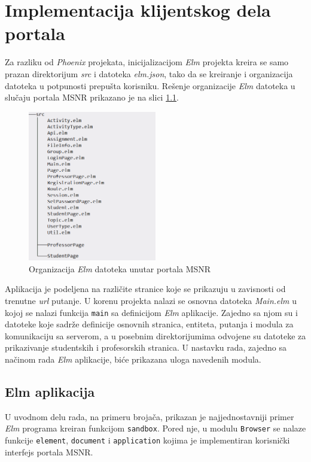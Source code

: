 \documentclass[12pt,oneside]{memoir}
\begin{document}
\chapter{Implementacija klijentskog dela portala}
Za razliku od \emph{Phoenix} projekata, inicijalizacijom \emph{Elm} projekta kreira
se samo prazan direktorijum \emph{src} i datoteka \emph{elm.json}, tako da se kreiranje i
organizacija datoteka u potpunosti prepušta korisniku. Rešenje organizacije \emph{Elm} datoteka u slučaju
portala MSNR prikazano je na slici \ref{fig:msnr-elm-src}.
\begin{figure}[!h]
  \centering
  \includegraphics[width=0.5\textwidth]{msnr-elm-src.png}
  \caption{Organizacija \emph{Elm} datoteka unutar portala MSNR}
  \label{fig:msnr-elm-src}
\end{figure}

Aplikacija je podeljena na različite stranice koje se prikazuju u zavisnosti od trenutne \emph{url} putanje. 
U korenu projekta nalazi se osnovna datoteka \emph{Main.elm} u kojoj se nalazi funkcija \texttt{main} sa definicijom \emph{Elm} aplikacije.
Zajedno sa njom su i datoteke koje sadrže definicije osnovnih stranica, entiteta, putanja i modula za komunikaciju sa serverom, a
u posebnim direktorijumima odvojene su datoteke za prikazivanje studentskih i profesorskih stranica. U nastavku rada, zajedno sa načinom
rada \emph{Elm} aplikacije, biće prikazana uloga navedenih modula.

\section{Elm aplikacija}
U uvodnom delu rada, na primeru brojača, prikazan je najjednostavniji primer \emph{Elm} programa kreiran funkcijom \texttt{sandbox}.
Pored nje, u modulu \texttt{Browser} se nalaze funkcije \texttt{element}, \texttt{document} i \texttt{application}
kojima je implementiran korisnički interfejs portala MSNR.
\end{document}
